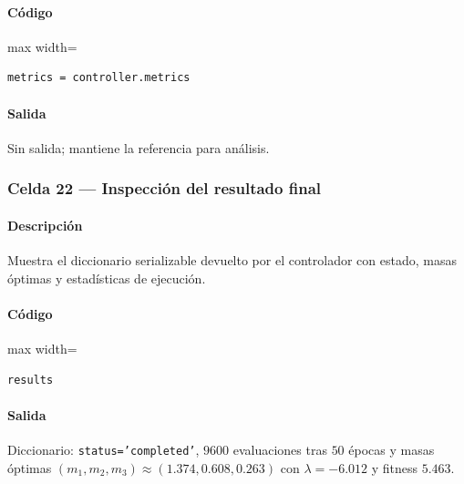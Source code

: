 \paragraph{Código}
\begin{listing}[H]
\caption{Celda 21: extracción de métricas}
\label{lst:c04_cell21}
\begin{adjustbox}{max width=\textwidth}
\begin{minipage}{\textwidth}
\begin{verbatim}
metrics = controller.metrics
\end{verbatim}
\end{minipage}
\end{adjustbox}
\end{listing}
\paragraph{Salida} Sin salida; mantiene la referencia para análisis.

\subsubsection*{Celda 22 — Inspección del resultado final}
\paragraph{Descripción} Muestra el diccionario serializable devuelto por el controlador con estado, masas óptimas y estadísticas de ejecución.
\paragraph{Código}
\begin{listing}[H]
\caption{Celda 22: resumen de \texttt{results}}
\label{lst:c04_cell22}
\begin{adjustbox}{max width=\textwidth}
\begin{minipage}{\textwidth}
\begin{verbatim}
results
\end{verbatim}
\end{minipage}
\end{adjustbox}
\end{listing}
\paragraph{Salida} Diccionario: \texttt{status='completed'}, $9600$ evaluaciones tras $50$ épocas y masas óptimas $(m_1,m_2,m_3) \approx (1.374, 0.608, 0.263)$ con $\lambda = -6.012$ y fitness $5.463$.

